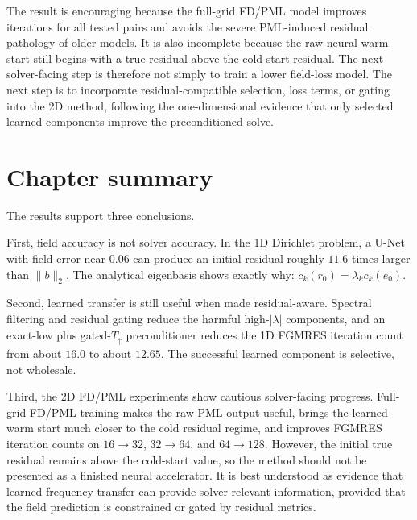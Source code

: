 The result is encouraging because the full-grid FD/PML model improves
iterations for all tested pairs and avoids the severe PML-induced residual
pathology of older models. It is also incomplete because the raw neural warm
start still begins with a true residual above the cold-start residual. The
next solver-facing step is therefore not simply to train a lower field-loss
model. The next step is to incorporate residual-compatible selection, loss
terms, or gating into the 2D method, following the one-dimensional evidence
that only selected learned components improve the preconditioned solve.

\section{Chapter summary}
\label{sec:results-summary}

The results support three conclusions.

First, field accuracy is not solver accuracy. In the 1D Dirichlet problem, a
U-Net with field error near $0.06$ can produce an initial residual roughly
$11.6$ times larger than $\|b\|_2$. The analytical eigenbasis shows exactly
why: $c_k(r_0)=\lambda_k c_k(e_0)$.

Second, learned transfer is still useful when made residual-aware. Spectral
filtering and residual gating reduce the harmful high-$|\lambda|$ components,
and an exact-low plus gated-$T_\uparrow$ preconditioner reduces the 1D FGMRES
iteration count from about $16.0$ to about $12.65$. The successful learned
component is selective, not wholesale.

Third, the 2D FD/PML experiments show cautious solver-facing progress. Full-grid
FD/PML training makes the raw PML output useful, brings the learned warm start
much closer to the cold residual regime, and improves FGMRES iteration counts
on $16\to32$, $32\to64$, and $64\to128$. However, the initial true residual
remains above the cold-start value, so the method should not be presented as a
finished neural accelerator. It is best understood as evidence that learned
frequency transfer can provide solver-relevant information, provided that the
field prediction is constrained or gated by residual metrics.
